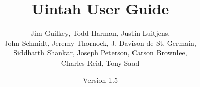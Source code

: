 \documentclass[12pt]{report}
\begin{document}
\title{Uintah User Guide}


\author{ Jim Guilkey, Todd Harman, Justin Luitjens, \\ John Schmidt, Jeremy Thornock, J. Davison de St. Germain, \\ Siddharth Shankar, Joseph Peterson, Carson Brownlee,\\ Charles Reid, Tony Saad}

\date{Version 1.5}

\maketitle

\tableofcontents

%

\newpage






%



\end{document}
